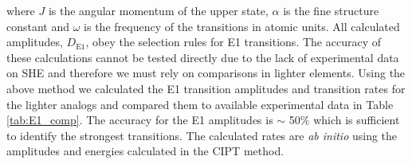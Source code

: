 \documentclass[10pt,a4paper, twoside, openright]{report}
\begin{document}
where $J$ is the angular momentum of the upper state, $\alpha$ is the fine structure constant and $\omega$ is the frequency of the transitions in atomic units. All calculated amplitudes, $D_{\text{E1}}$, obey the selection rules for E1 transitions. The accuracy of these calculations cannot be tested directly due to the lack of experimental data on SHE and therefore we must rely on comparisons in lighter elements. Using the above method we calculated the E1 transition amplitudes and transition rates for the lighter analogs and compared them to available experimental data in Table \ref{tab:E1_comp}. The accuracy for the E1 amplitudes is $\sim$ 50\% which is sufficient to identify the strongest transitions. The calculated rates are \textit{ab initio} using the amplitudes and energies calculated in the CIPT method.  \\
\end{document}

